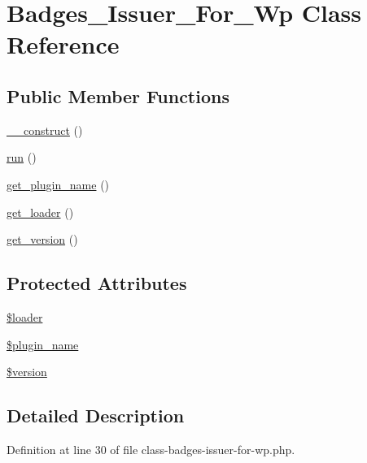 \hypertarget{class_badges___issuer___for___wp}{}\section{Badges\+\_\+\+Issuer\+\_\+\+For\+\_\+\+Wp Class Reference}
\label{class_badges___issuer___for___wp}
\subsection*{Public Member Functions}
\begin{DoxyCompactItemize}
\item 
\hyperlink{class_badges___issuer___for___wp_a095c5d389db211932136b53f25f39685}{\+\_\+\+\_\+construct} ()
\item 
\hyperlink{class_badges___issuer___for___wp_afb0fafe7e02a3ae1993c01c19fad2bae}{run} ()
\item 
\hyperlink{class_badges___issuer___for___wp_ac167594092be2e67466f12eabdf6fc52}{get\+\_\+plugin\+\_\+name} ()
\item 
\hyperlink{class_badges___issuer___for___wp_a73bc2ecc211930c4a1f8b9385c8004d5}{get\+\_\+loader} ()
\item 
\hyperlink{class_badges___issuer___for___wp_a5724f2c1a8d9303e139195c3354af02a}{get\+\_\+version} ()
\end{DoxyCompactItemize}
\subsection*{Protected Attributes}
\begin{DoxyCompactItemize}
\item 
\hyperlink{class_badges___issuer___for___wp_ab832f4c463ee1c9ba2e9464265f7ea3b}{\$loader}
\item 
\hyperlink{class_badges___issuer___for___wp_aebacc51188e2a01d35a6a6fe9161d0ce}{\$plugin\+\_\+name}
\item 
\hyperlink{class_badges___issuer___for___wp_a17c8948c68aa44fa9961ae169b6a8961}{\$version}
\end{DoxyCompactItemize}


\subsection{Detailed Description}


Definition at line 30 of file class-\/badges-\/issuer-\/for-\/wp.\+php.



